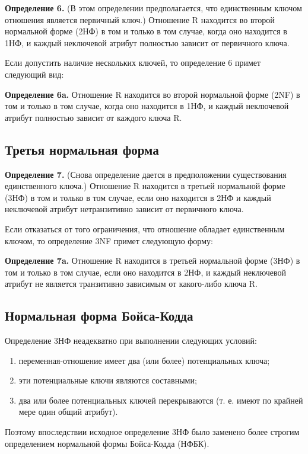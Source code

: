 \textbf{Определение 6.} (В этом определении предполагается, что единственным ключом отношения является первичный ключ.) Отношение R находится во второй нормальной форме (2НФ) в том и только в том случае, когда оно находится в 1НФ, и каждый неключевой атрибут полностью зависит от первичного ключа.

Если допустить наличие нескольких ключей, то определение 6 примет следующий вид: 

\textbf{Определение 6a.} Отношение R находится во второй нормальной форме (2NF) в том и только в том случае, когда оно находится в 1НФ, и каждый неключевой атрибут полностью зависит от каждого ключа R.

\subsection*{Третья нормальная форма}

\textbf{Определение 7.} (Снова определение дается в предположении существования единственного ключа.) Отношение R находится в третьей нормальной форме (3НФ) в том и только в том случае, если оно находится в 2НФ и каждый неключевой атрибут нетранзитивно зависит от первичного ключа.

Если отказаться от того ограничения, что отношение обладает единственным ключом, то определение 3NF примет следующую форму: 

\textbf{Определение 7a.} Отношение R находится в третьей нормальной форме (3НФ) в том и только в том случае, если оно находится в 2НФ, и каждый неключевой атрибут не является транзитивно зависимым от какого-либо ключа R.

\subsection*{Нормальная форма Бойса-Кодда}

Определение 3НФ неадекватно при выполнении следующих условий:

\begin{enumerate}[label={\arabic*)}]
	\item  переменная-отношение имеет два (или более) потенциальных ключа;
	\item  эти потенциальные ключи являются составными;
	\item  два или более потенциальных ключей перекрываются (т. е. имеют по крайней мере один общий атрибут).
\end{enumerate}

Поэтому впоследствии исходное определение 3НФ было заменено более строгим определением нормальной формы Бойса-Кодда (НФБК).

